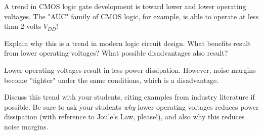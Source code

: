 

A trend in CMOS logic gate development is toward lower and lower operating voltages.  The "AUC" family of CMOS logic, for example, is able to operate at less than 2 volts $V_{DD}$!

Explain why this is a trend in modern logic circuit design.  What benefits result from lower operating voltages?  What possible disadvantages also result?







Lower operating voltages result in less power dissipation.  However, noise margins become "tighter" under the same conditions, which is a disadvantage.







Discuss this trend with your students, citing examples from industry literature if possible.  Be sure to ask your students {\it why} lower operating voltages reduces power dissipation (with reference to Joule's Law, please!), and also why this reduces noise margins.




